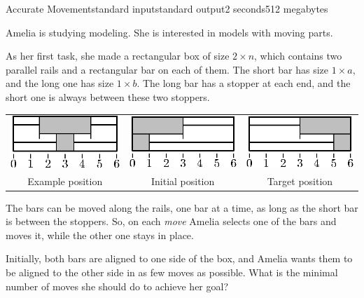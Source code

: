 \begin{problem}{Accurate Movement}{standard input}{standard output}{2 seconds}{512 megabytes}

Amelia is studying modeling. She is interested in models with moving parts.

As her first task, she made a rectangular box of size $2 \times n$, which contains two parallel rails and a rectangular bar on each of them. The short bar has size $1 \times a$, and the long one has size $1 \times b$. The long bar has a stopper at each end, and the short one is always between these two stoppers.

\begin{center}
\begin{tabular}{ccc}
\includegraphics{bars-1.ps} & \includegraphics{bars-2.ps} & \includegraphics{bars-3.ps} \\
Example position & Initial position & Target position \\
\end{tabular}
\end{center}

The bars can be moved along the rails, one bar at a time, as long as the short bar is between the stoppers. So, on each \textit{move} Amelia selects one of the bars and moves it, while the other one stays in place.

Initially, both bars are aligned to one side of the box, and Amelia wants them to be aligned to the other side in as few moves as possible. What is the minimal number of moves she should do to achieve her goal?


\end{problem}
